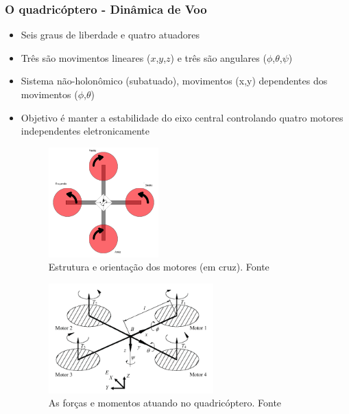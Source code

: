 \documentclass{beamer}
\begin{document}
\begin{frame}[allowframebreaks]
	
	\frametitle{O quadricóptero - Dinâmica de Voo}
	
	\begin{itemize}
		
		\item Seis graus de liberdade e quatro atuadores
				
		\item Três são movimentos lineares ($x$,$y$,$z$) e três são angulares ($\phi$,$\theta$,$\psi$)
						
		\item  Sistema não-holonômico (subatuado), movimentos (x,y) dependentes dos movimentos
	    ($\phi$,$\theta$) \cite{Figueiredo2004}
				
		\item Objetivo é manter a estabilidade do eixo central controlando quatro motores independentes eletronicamente
		
	\framebreak	
		
		
		\begin{figure}
			\centering
			\includegraphics[keepaspectratio = true,
			width=0.4\textwidth]{img/propellerdirections.png}
			\caption{Estrutura e orientação dos motores (em cruz). Fonte \cite{rocopter}}
			\label{fig:diag quad}
		\end{figure}
		
		
	\framebreak
	
		
		\begin{figure}
			\centering
			\includegraphics[keepaspectratio = true,
			width=0.6\textwidth]{img/diagrama_quadricoptero_old.png}
			\caption{As forças e momentos atuando no quadricóptero. Fonte \cite{Mian2008}}
			\label{fig:diag quad2}
		\end{figure}
		

\end{itemize}
\end{frame}
\end{document}
